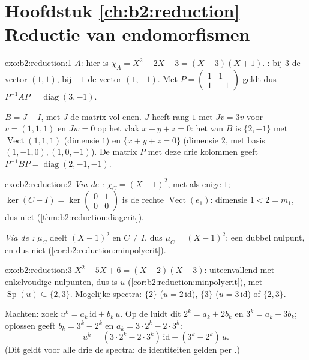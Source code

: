 \section*{Hoofdstuk \ref{ch:b2:reduction} --- Reductie van endomorfismen}

\begin{solution}{exo:b2:reduction:1}
$A$: hier is $\chi_A = X^2 - 2X - 3 = (X - 3)(X + 1)$.
: bij $3$ de vector $(1,1)$, bij $-1$ de vector
$(1,-1)$. Met $P = \begin{pmatrix} 1 & 1\\ 1 & -1\end{pmatrix}$
geldt dus $P^{-1}AP = \operatorname{diag}(3, -1)$.

$B = J - I$, met $J$ de matrix vol enen. $J$ heeft rang $1$ met $Jv
= 3v$ voor $v = (1,1,1)$ en $Jw = 0$ op het vlak $x + y + z = 0$:
het  van $B$ is $\{2, -1\}$ met 
$\operatorname{Vect}(1,1,1)$ (dimensie $1$) en $\{x + y + z = 0\}$
(dimensie $2$, met basis $(1,-1,0), (1,0,-1)$). De matrix $P$ met
deze drie kolommen geeft $P^{-1}BP = \operatorname{diag}(2, -1,
-1)$.
\end{solution}

\begin{solution}{exo:b2:reduction:2}
\emph{Via de :} $\chi_C = (X-1)^2$, met als enige
 $1$; $\ker(C - I) = \ker\begin{pmatrix} 0&1\\
0&0\end{pmatrix}$ is de rechte $\operatorname{Vect}(e_1)$: dimensie
$1 < 2 = m_1$, dus niet 
(\cref{thm:b2:reduction:diagcrit}).

\emph{Via de :} $\mu_C$ deelt $(X-1)^2$ en $C \neq
I$, dus $\mu_C = (X-1)^2$: een dubbel nulpunt, en dus niet
 (\cref{cor:b2:reduction:minpolycrit}).
\end{solution}

\begin{solution}{exo:b2:reduction:3}
$X^2 - 5X + 6 = (X-2)(X-3)$: uiteenvallend met enkelvoudige
nulpunten, dus is $u$ 
(\cref{cor:b2:reduction:minpolycrit}), met $\operatorname{Sp}(u)
\subseteq \{2, 3\}$. Mogelijke spectra: $\{2\}$ ($u =
2\,\mathrm{id}$), $\{3\}$ ($u = 3\,\mathrm{id}$) of $\{2, 3\}$.

Machten: zoek $u^k = a_k\,\mathrm{id} + b_k\,u$. Op de 
luidt dit $2^k = a_k + 2b_k$ en $3^k = a_k + 3b_k$; oplossen geeft
$b_k = 3^k - 2^k$ en $a_k = 3\cdot2^k - 2\cdot 3^k$:
\[
u^k = (3\cdot 2^k - 2\cdot 3^k)\,\mathrm{id} + (3^k - 2^k)\, u .
\]
(Dit geldt voor alle drie de spectra: de identiteiten gelden per
.)
\end{solution}

